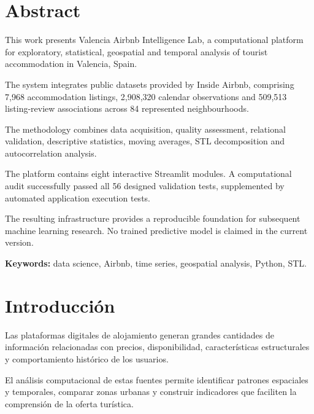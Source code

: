 \documentclass[11pt,a4paper]{article}
\begin{document}
\section*{Abstract}

This work presents Valencia Airbnb Intelligence Lab,
a computational platform for exploratory, statistical,
geospatial and temporal analysis of tourist accommodation
in Valencia, Spain.

The system integrates public datasets provided by Inside
Airbnb, comprising 7,968 accommodation listings,
2,908,320 calendar observations and 509,513 listing-review
associations across 84 represented neighbourhoods.

The methodology combines data acquisition, quality
assessment, relational validation, descriptive statistics,
moving averages, STL decomposition and autocorrelation
analysis.

The platform contains eight interactive Streamlit modules.
A computational audit successfully passed all 56 designed
validation tests, supplemented by automated application
execution tests.

The resulting infrastructure provides a reproducible
foundation for subsequent machine learning research.
No trained predictive model is claimed in the current
version.

\textbf{Keywords:} data science, Airbnb, time series,
geospatial analysis, Python, STL.

\endgroup

\clearpage

\tableofcontents

\clearpage

\listoffigures

\clearpage


\section{Introducción}

Las plataformas digitales de alojamiento generan
grandes cantidades de información relacionadas con
precios, disponibilidad, características estructurales
y comportamiento histórico de los usuarios.

El análisis computacional de estas fuentes permite
identificar patrones espaciales y temporales, comparar
zonas urbanas y construir indicadores que faciliten
la comprensión de la oferta turística.
\end{document}
